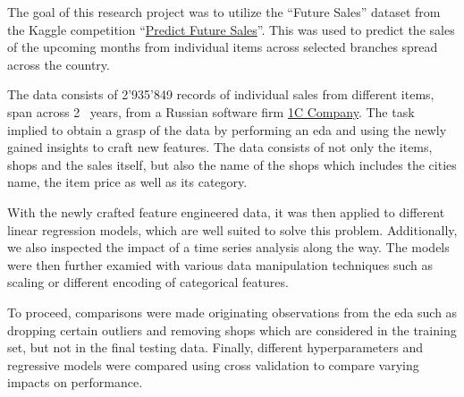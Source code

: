 The goal of this research project was to utilize the \enquote{Future Sales} dataset from the Kaggle competition \enquote{\href{https://www.kaggle.com/c/competitive-data-science-predict-future-sales}{Predict Future Sales}}.
This was used to predict the sales of the upcoming months from individual items across selected branches spread across the country.

The data consists of 2'935'849 records of individual sales from different items, span across 2 \textonehalf \ years, from a Russian software firm \href{https://1c.ru/eng/title.htm}{1C Company}.
The task implied to obtain a grasp of the data by performing an \acrfull{eda} and using the newly gained insights to craft new features.
The data consists of not only the items, shops and the sales itself, but also the name of the shops which includes the cities name, the item price as well as its category.

With the newly crafted feature engineered data, it was then applied to different linear regression models, which are well suited to solve this problem.
Additionally, we also inspected the impact of a time series analysis along the way.
The models were then further examied with various data manipulation techniques such as scaling or different encoding of categorical features.

To proceed, comparisons were made originating observations from the \acrshort{eda} such as dropping certain outliers and removing shops which are considered in the training set, but not in the final testing data.
Finally, different hyperparameters and regressive models were compared using cross validation to compare varying impacts on performance.
